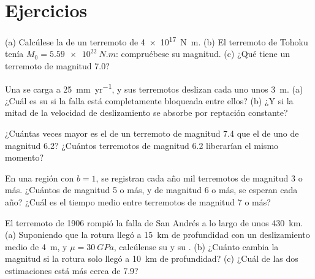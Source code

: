 \section{Ejercicios}

\begin{exercise}[$\star$]\label{exo:b1:earthquake-source:1}
(a) Calcúlese la  de un terremoto de  \qty{4e17}{N.m}. (b) El terremoto de Tohoku tenía
$M_0 = \qty{5.59e22}{N.m}$: compruébese su magnitud. (c) ¿Qué  tiene un terremoto de magnitud 7.0?
\end{exercise}

\begin{exercise}[$\star$]\label{exo:b1:earthquake-source:2}
Una  se carga a \qty{25}{mm.yr^{-1}}, y sus terremotos deslizan cada uno unos \qty{3}{m}. (a) ¿Cuál es su  si la falla está completamente bloqueada entre ellos? (b) ¿Y si la mitad de la velocidad de deslizamiento se absorbe por
reptación constante?
\end{exercise}

\begin{exercise}[$\star$]\label{exo:b1:earthquake-source:3}
¿Cuántas veces mayor es el  de un terremoto de magnitud 7.4 que el de uno de magnitud 6.2? ¿Cuántos terremotos de magnitud
6.2 liberarían el mismo momento?
\end{exercise}

\begin{exercise}[$\star$]\label{exo:b1:earthquake-source:4}
En una región con $b = 1$, se registran cada año mil terremotos de magnitud 3 o más. ¿Cuántos de magnitud 5 o más, y de magnitud 6 o más,
se esperan cada año? ¿Cuál es el tiempo medio entre terremotos de magnitud 7 o más?
\end{exercise}

\begin{exercise}[$\star\star$]\label{exo:b1:earthquake-source:5}
El terremoto de 1906 rompió la falla de San Andrés a lo largo de unos \qty{430}{km}. (a) Suponiendo que la rotura llegó a \qty{15}{km}
de profundidad con un deslizamiento medio de \qty{4}{m}, y $\mu = \qty{30}{GPa}$, calcúlense su  y su .
(b) ¿Cuánto cambia la magnitud si la rotura solo llegó a \qty{10}{km} de profundidad? (c) ¿Cuál de las dos estimaciones está más cerca de 7.9?
\end{exercise}

